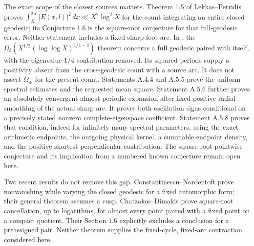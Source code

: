 The exact scope of the closest sources matters. Theorem 1.5 of
Lekkas--Petridis \cite{LekkasPetridis2026} proves
$\int_X^{2X}|E(x,l)|^2\,dx\ll X^2\log^2X$ for the count integrating
an entire closed geodesic; its Conjecture 1.6 is the square-root
conjecture for that full-geodesic error. Neither statement includes a
fixed sharp foot arc. In \cite[Theorem 3]{Voskou2025Omega}, the
$\Omega_\delta(X^{1/2}(\log\log X)^{1/4-\delta})$ theorem concerns a
full geodesic paired with itself, with the eigenvalue-$1/4$ contribution
removed. Its squared periods supply a positivity absent from the
cross-geodesic count with a source arc. It does not assert
$\Omega_\pm$ for the present count. Statements A.4.4 and A.5.5 prove
the uniform spectral estimates and the requested mean square.
Statement A.5.6 further proves an absolutely convergent
almost-periodic expansion after fixed positive radial smoothing
of the actual sharp arc. It proves both oscillation signs conditional
on a precisely stated nonzero complete-eigenspace coefficient.
Statement A.5.8 proves that condition, indeed for infinitely many
spectral parameters, using the exact arithmetic endpoints,
the outgoing physical kernel, a summable endpoint density, and
the positive shortest-perpendicular contribution.
The square-root pointwise conjecture and its implication from
a numbered known conjecture remain open here.

Two recent results do not remove this gap.
Constantinescu--Nordentoft \cite[Theorems 1.3 and 1.5]{ConstantinescuNordentoft2025}
prove nonvanishing while varying the closed geodesic for a fixed
automorphic form; their general theorem assumes a cusp.
Chatzakos--Dimakis \cite[Theorem 1.2]{ChatzakosDimakis2026} prove
square-root cancellation, up to logarithms, for almost every
point paired with a fixed point on a compact quotient.
Their Section 1.6 explicitly excludes a conclusion for a
preassigned pair. Neither theorem supplies the fixed-cycle,
fixed-arc contraction considered here.


